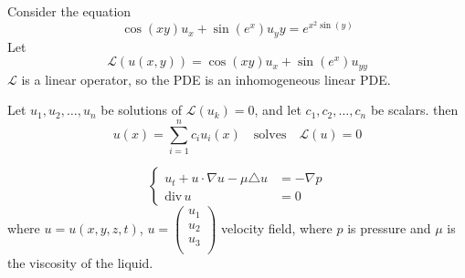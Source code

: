 \begin{example}
	Consider the equation
	\[ \cos(xy) u_x + \sin \left( e^x \right) u_yy = e^{x^2\sin (y)} \]
	Let 
	\[ \mathscr L(u(x,y)) = \cos(xy) u_x + \sin \left( e^x \right) u_{yy} \]
	$\mathscr L$ is a linear operator, so the PDE is an inhomogeneous linear PDE.
\end{example}
\begin{theorem}
	Let $u_1, u_2, \ldots, u_n$ be solutions of $\mathscr L(u_k) = 0$, and let $c_1, c_2, \ldots, c_n$ be scalars. then
	\[ u(x) = \sum_{i = 1}^{n} c_i u_i(x) \quad \mathrm{ solves } \quad \mathscr L(u) = 0\]
\end{theorem}
\begin{example}
	\[ \left\{\begin{array}{rl}
		u_t + u \cdot \nabla u - \mu \triangle u &= - \nabla p \\
		\mathrm{div}\, u	&= 0 \end{array} \right.\]
		where $u = u(x,y,z,t)$, $u = \begin{pmatrix}
			u_1 \\
			u_2 \\
			u_3 \\
		\end{pmatrix}$ velocity field, where $p$ is pressure and $\mu$ is the viscosity of the liquid.
\end{example}
